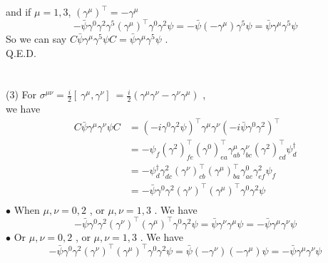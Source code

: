 \documentclass[12pt]{article}
\begin{document}
\begin{spacing}{1.5}
\begin{equation}
	\tag{3.2.2}
\end{equation}
and if $\mu=1, 3$, $(\gamma^{\mu})^{\top} = -\gamma^{\mu}$
\begin{equation}
-\bar\psi \gamma^{0}\gamma^{2} \gamma^{5}(\gamma^{\mu})^{\top} \gamma^{0}\gamma^{2} \psi = -\bar\psi (-\gamma^{\mu})\gamma^{5} \psi = \bar\psi \gamma^{\mu}\gamma^{5} \psi
	\tag{3.2.3}
\end{equation}
So we can say $\displaystyle C\bar\psi\gamma^{\mu}\gamma^{5}\psi C = \bar\psi \gamma^{\mu}\gamma^{5} \psi$ . \\
Q.E.D.\\
~\\
~\\
(3) For $\displaystyle \sigma^{\mu\nu}=\frac{i}{2} [\ \gamma^{\mu}, \gamma^{\nu} ]\ = \frac{i}{2}(\gamma^{\mu}\gamma^{\nu}-\gamma^{\nu}\gamma^{\mu})$ ,\\
we have \\
\begin{equation}
\begin{aligned}
C \bar\psi\gamma^{\mu}\gamma^{\nu}\psi C &= (-i\gamma^{0}\gamma^{2}\psi)^{\top}\gamma^{\mu}\gamma^{\nu}(-i\bar\psi\gamma^{0}\gamma^{2})^{\top} \\
&= -\psi_{f} (\gamma^{2})^{\top}_{fe}(\gamma^{0})^{\top}_{ea} \gamma^{\mu}_{ab}\gamma^{\nu}_{bc} (\gamma^{2})^{\top}_{cd} \psi^{\dagger}_{d} \\
&= -\psi^{\dagger}_{d} \gamma^{2}_{dc} (\gamma^{\nu})^{\top}_{cb}(\gamma^{\mu})^{\top}_{ba} \gamma^{0}_{ae}\gamma^{2}_{ef} \psi_{f} \\
&= -\bar\psi \gamma^{0}\gamma^{2} (\gamma^{\nu})^{\top}(\gamma^{\mu})^{\top} \gamma^{0}\gamma^{2} \psi\\
\end{aligned}
	\tag{3.3.1}
\end{equation}
$\bullet$ When $\mu, \nu = 0, 2$ , or $\mu, \nu = 1, 3$ . We have
\begin{equation}
-\bar\psi \gamma^{0}\gamma^{2} (\gamma^{\nu})^{\top}(\gamma^{\mu})^{\top} \gamma^{0}\gamma^{2} \psi = \bar\psi \gamma^{\nu}\gamma^{\mu} \psi = -\bar\psi \gamma^{\mu}\gamma^{\nu} \psi
	\tag{3.3.2}
\end{equation}
$\bullet$ Or $\mu,\nu = 0,2$ , or $\mu,\nu = 1,3$ . We have
\begin{equation}
-\bar\psi \gamma^{0}\gamma^{2} (\gamma^{\nu})^{\top}(\gamma^{\mu})^{\top} \gamma^{0}\gamma^{2} \psi = \bar\psi (-\gamma^{\nu})(-\gamma^{\mu}) \psi = -\bar\psi \gamma^{\mu}\gamma^{\nu} \psi
	\tag{3.3.3}
\end{equation}

\end{spacing}
\end{document}
